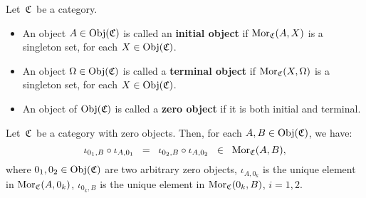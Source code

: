 
\vskip 0.5cm
\begin{definition}
\mbox{}
\vskip 0.15cm
\noindent
Let \,$\mathfrak{C}$\, be a category.
\begin{itemize}
\item
	An object $A \in \textnormal{Obj}(\mathfrak{C})$ is called an \textbf{initial object} if $\textnormal{Mor}_{\mathfrak{C}}(A,X)$ is a singleton set,
	for each $X \in \textnormal{Obj}(\mathfrak{C})$.
\item
	An object $\Omega \in \textnormal{Obj}(\mathfrak{C})$ is called a \textbf{terminal object} if $\textnormal{Mor}_{\mathfrak{C}}(X,\Omega)$ is a singleton set,
	for each $X \in \textnormal{Obj}(\mathfrak{C})$.
\item
	An object of $\textnormal{Obj}(\mathfrak{C})$ is called a \textbf{zero object} if it is both initial and terminal.
\end{itemize}
\end{definition}


\vskip 0.5cm
\begin{lemma}
\mbox{}
\vskip 0.15cm
\noindent
Let \,$\mathfrak{C}$\, be a category with zero objects.
Then, for each $A, B \in \textnormal{Obj}(\mathfrak{C})$, we have:
\begin{equation*}
\iota_{0_{1},B}\circ\iota_{A,0_{1}}
\;\; = \;\;
	\iota_{0_{2},B}\circ\iota_{A,0_{2}}
\;\; \in \;\;
	\textnormal{Mor}_{\mathfrak{C}}(A,B),
\end{equation*}
where
$0_{1}, 0_{2} \in \textnormal{Obj}(\mathfrak{C})$ are two arbitrary zero objects,
$\iota_{A,0_{k}}$ is the unique element in $\textnormal{Mor}_{\mathfrak{C}}(A,0_{k})$,
$\iota_{0_{k},B}$ is the unique element in $\textnormal{Mor}_{\mathfrak{C}}(0_{k},B)$,
$i = 1,2$.
\end{lemma}


